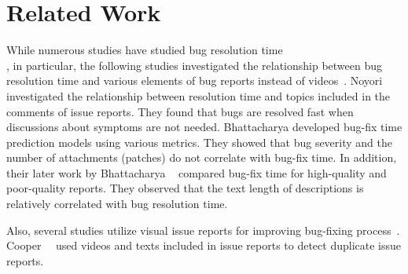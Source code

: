 \section{Related Work}
\label{sec:relate}
While numerous studies have studied bug resolution time~\citep{DBLP:conf/msr/ChenNSH14}\citep{DBLP:journals/jss/GarciaSN18}\citep{DBLP:conf/sigsoft/JeongKZ09}\\
\citep{DBLP:conf/icsm/KashiwaYKO14}\citep{DBLP:conf/msr/ZamanAH11}, 
in particular, the following studies investigated the relationship between bug resolution time and various elements of bug reports instead of videos~\citep{DBLP:conf/msr/BhattacharyaN11}\citep{DBLP:conf/csmr/BhattacharyaUNK13}\citep{DBLP:journals/ieicetd/NoyoriWFKONT21}. 
Noyori~\et~\citep{DBLP:journals/ieicetd/NoyoriWFKONT21} investigated the relationship between resolution time and topics included in the comments of issue reports. 
They found that bugs are resolved fast when discussions about symptoms are not needed.  Bhattacharya \et \citep{DBLP:conf/msr/BhattacharyaN11} developed bug-fix
time prediction models using various metrics. They showed that bug severity and the number of attachments (patches) do not correlate with bug-fix time. In addition, their later work by Bhattacharya \et~\citep{DBLP:conf/csmr/BhattacharyaUNK13} compared bug-fix time for high-quality and poor-quality reports. They observed that the text length of descriptions is relatively correlated with bug resolution time. 

Also, several studies utilize visual issue reports for improving bug-fixing process~\citep{DBLP:conf/icse/CooperBCMP21}\citep{feng2021arxiv}. Cooper~\et~\citep{DBLP:conf/icse/CooperBCMP21} used videos and texts included in issue reports to detect duplicate issue reports. 